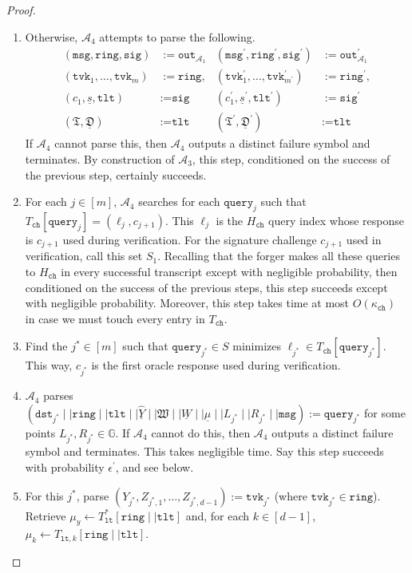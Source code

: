 \documentclass[11pt]{article}
\theoremstyle{definition}
\newcommand{\G}{\mathbb{G}}
\newcommand{\lt}{\texttt{lt}}
\newcommand{\tlt}{\texttt{tlt}}
\newcommand{\tvk}{\texttt{tvk}}
\newcommand{\ring}{\texttt{ring}}
\newcommand{\sig}{\texttt{sig}}
\newcommand{\msg}{\texttt{msg}}
\newcommand{\signaturequerystar}{(\texttt{dst}_{j^*} \mid \mid \ring \mid \mid \tlt \mid \mid \underline{\widehat{Y}} \mid \mid \mathfrak{W} \mid \mid \underline{W} \mid \mid \underline{\mu} \mid \mid L_{j^*} \mid \mid R_{j^*} \mid \mid \msg)}
\begin{document}
\begin{proof}
\begin{enumerate}
\item Otherwise, $\mathcal{A}_4$ attempts to parse the following.
\begin{align*}
(\msg, \ring, \sig) &:= \texttt{out}_{\mathcal{A}_1} & (\msg^\prime, \ring^\prime, \sig^\prime) &:= \texttt{out}_{\mathcal{A}_1}^\prime \\
(\tvk_1, \ldots, \tvk_m) &:= \ring, &
(\tvk_1^\prime, \ldots, \tvk_{m^\prime}^\prime) &:= \ring^\prime, \\
(c_1, \underline{s}, \tlt) &:= \sig &
(c_1^\prime, \underline{s}^\prime, \tlt^\prime) &:= \sig^\prime \\
(\mathfrak{T}, \underline{\mathfrak{D}}) &:= \tlt & (\mathfrak{T}^\prime, \underline{\mathfrak{D}}^\prime) &:= \tlt 
\end{align*} If $\mathcal{A}_4$ cannot parse this, then $\mathcal{A}_4$ outputs a distinct failure symbol and terminates. By construction of $\mathcal{A}_3$, this step, conditioned on the success of the previous step, certainly succeeds.

\item For each $j \in [m]$, $\mathcal{A}_4$ searches for each $\texttt{query}_j$ such that $T_{\texttt{ch}}[\texttt{query}_j]=(\ell_j, c_{j+1})$. This $\ell_j$ is the $H_{\texttt{ch}}$ query index whose response is $c_{j+1}$ used during verification. For the signature challenge $c_{j+1}$ used in verification, call this set $S_1$. Recalling that the forger makes all these queries to $H_{\texttt{ch}}$ in every successful transcript except with negligible probability, then conditioned on the success of the previous steps, this step succeeds except with negligible probability. Moreover, this step takes time at most $O(\kappa_{\texttt{ch}})$ in case we must touch every entry in $T_{\texttt{ch}}$.

\item Find the $j^* \in [m]$ such that $\texttt{query}_{j^*} \in S$ minimizes $\ell_{j^*} \in T_{\texttt{ch}}[\texttt{query}_{j^*}]$. This way, $c_{j^*}$ is the first oracle response used during verification.

\item $\mathcal{A}_4$ parses $\signaturequerystar:= \texttt{query}_{j^*}$ for some points $L_{j^*}, R_{j^*} \in \G$. If $\mathcal{A}_4$ cannot do this, then $\mathcal{A}_4$ outputs a distinct failure symbol and terminates. This takes negligible time. Say this step succeeds with probability $\epsilon^\prime$, and see below.

\item For this $j^*$, parse $(Y_{j^*}, Z_{j^*, 1}, \ldots, Z_{j^*, d-1}) := \tvk_{j^*}$ (where $\tvk_{j^*} \in \ring$). Retrieve $\mu_y \leftarrow T_{\lt}^*[\ring \mid \mid \tlt]$ and, for each $k \in [d-1]$, $\mu_k \leftarrow T_{\lt, k}[\ring \mid \mid \tlt]$.


\end{enumerate}
\end{proof}
\end{document}

